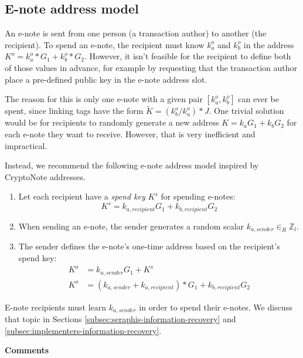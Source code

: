 \subsection{E-note address model}
\label{subsec:seraphis-address-model}

An e-note is sent from one person (a transaction author) to another (the recipient). To spend an e-note, the recipient must know $k^o_a$ and $k^o_b$ in the address $K^o = k^o_a*G_1 + k^o_b*G_2$. However, it isn't feasible for the recipient to define both of those values in advance, for example by requesting that the transaction author place a pre-defined public key in the e-note address slot.

The reason for this is only one e-note with a given pair $[k^o_a, k^o_b]$ can ever be spent, since linking tags have the form $\tilde{K} = (k^o_b/k^o_a)*J$. One trivial solution would be for recipients to randomly generate a new address $K = k_a G_1 + k_b G_2$ for each e-note they want to receive. However, that is very inefficient and impractical.

Instead, we recommend the following e-note address model inspired by CryptoNote addresses.

\begin{enumerate}
    \item Let each recipient have a {\em spend key} $K^s$ for spending e-notes:\vspace{.115cm}
    \[K^s = k_{a, recipient} G_1 + k_{b, recipient} G_2\]

    \item When sending an e-note, the sender generates a random scalar $k_{a, sender} \in_R \mathbb{Z}_l$.

    \item The sender defines the e-note's one-time address based on the recipient's spend key:\vspace{.115cm}
    \begin{align*}
        K^o &= k_{a, sender} G_1 + K^s \\
        K^o &= (k_{a, sender} + k_{a, recipient})*G_1 + k_{b, recipient} G_2
    \end{align*}
\end{enumerate}

E-note recipients must learn $k_{a, sender}$ in order to spend their e-notes. We discuss that topic in Sections \ref{subsec:seraphis-information-recovery} and \ref{subsec:implementers-information-recovery}.

\textbf{Comments}

